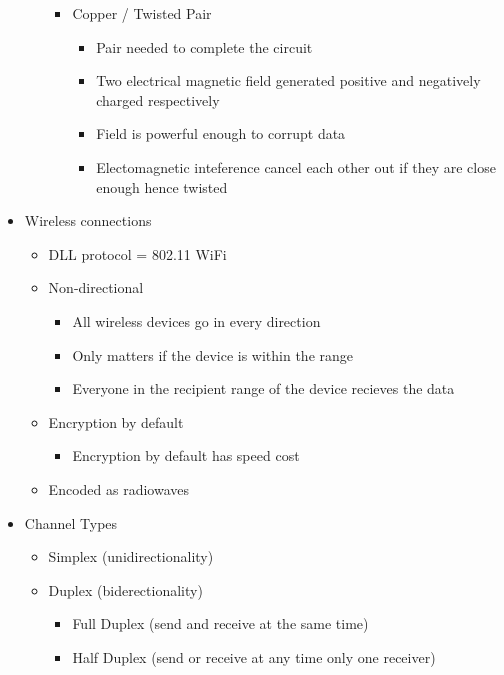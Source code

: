 \documentclass{article}
\begin{document}
\begin{itemize}
\begin{itemize}
        \begin{itemize}
            \item Copper / Twisted Pair
            \begin{itemize}
                \item Pair needed to complete the circuit
                \item Two electrical magnetic field generated positive and negatively charged respectively
                \item Field is powerful enough to corrupt data
                \item Electomagnetic inteference cancel each other out if they are close enough hence twisted 
            \end{itemize}
        \end{itemize}
    \end{itemize}
    \item Wireless connections
    \begin{itemize}
        \item DLL protocol = 802.11 WiFi
        \item Non-directional 
        \begin{itemize}
            \item All wireless devices go in every direction
            \item Only matters if the device is within the range
            \item Everyone in the recipient range of the device recieves the data
        \end{itemize}
        \item Encryption by default
        \begin{itemize}
            \item Encryption by default has speed cost
        \end{itemize}
        \item Encoded as radiowaves
    \end{itemize}
    \item Channel Types
    \begin{itemize}
        \item Simplex (unidirectionality)
        \item Duplex (biderectionality)
        \begin{itemize}
            \item Full Duplex (send and receive at the same time)
            \item Half Duplex (send or receive at any time only one receiver)

\end{itemize}
\end{itemize}
\end{itemize}
\end{document}
